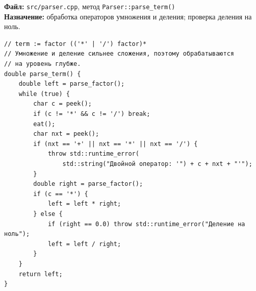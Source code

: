



\noindent\textbf{Файл:} \texttt{src/parser.cpp}, метод \texttt{Parser::parse\_term()}\\
\textbf{Назначение:} обработка операторов умножения и деления; проверка деления на ноль.

\begin{lstlisting}
// term := factor (('*' | '/') factor)*
// Умножение и деление сильнее сложения, поэтому обрабатываются
// на уровень глубже.
double parse_term() {
    double left = parse_factor();
    while (true) {
        char c = peek();
        if (c != '*' && c != '/') break;
        eat();
        char nxt = peek();
        if (nxt == '+' || nxt == '*' || nxt == '/') {
            throw std::runtime_error(
                std::string("Двойной оператор: '") + c + nxt + "'");
        }
        double right = parse_factor();
        if (c == '*') {
            left = left * right;
        } else {
            if (right == 0.0) throw std::runtime_error("Деление на ноль");
            left = left / right;
        }
    }
    return left;
}
\end{lstlisting}


